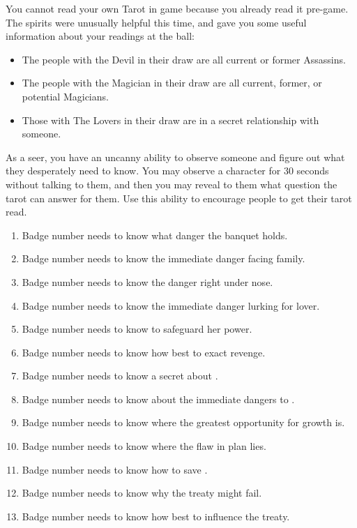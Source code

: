 \documentclass[green]{NeptuneBall}
\begin{document}
You cannot read your own Tarot in game because you already read it pre-game. The spirits were unusually helpful this time, and gave you some useful information about your readings at the ball:

\begin{itemize}
\item The people with the Devil in their draw are all current or former Assassins.
\item The people with the Magician in their draw are all current, former, or potential Magicians.
\item Those with The Lovers in their draw are in a secret relationship with someone.
\end{itemize}

\newpage
As a seer, you have an uncanny ability to observe someone and figure out what they desperately need to know.  You may observe a character for 30 seconds without talking to them, and then you may reveal to them what question the tarot can answer for them. Use this ability to encourage people to get their tarot read.

\begin{enumerate}
	\item Badge number \cPlant{\MYnumber} needs to know what danger the banquet holds.
	\item Badge number \cKing{\MYnumber} needs to know the immediate danger facing \cKing{\their} family.
	\item Badge number \cQueen{\MYnumber} needs to know the danger right under  nose.
	\item Badge number \cGeneral{\MYnumber} needs to know the immediate danger lurking for \cGeneral{\their} lover.
	\item Badge number \cWitch{\MYnumber} needs to know to safeguard her power.
	\item Badge number \cPriest{\MYnumber} needs to know how best to exact revenge.
	\item Badge number \cPrincess{\MYnumber} needs to know a secret about \cPrincess{\their} \cAthena{\parent}.
	\item Badge number \cAriel{\MYnumber} needs to know about the immediate dangers to \pAtlantis{}.
	\item Badge number \cWillow{\MYnumber} needs to know where the greatest opportunity for growth is.
	\item Badge number \cManta{\MYnumber} needs to know where the flaw in \cManta{\their} plan lies.
	\item Badge number \cBodyguard{\MYnumber} needs to know how to save \pPacifica{}.
	\item Badge number \cPrince{\MYnumber} needs to know why the treaty might fail.
	\item Badge number \cSpy{\MYnumber} needs to know how best to influence the treaty.
\end{enumerate}
\end{document}
